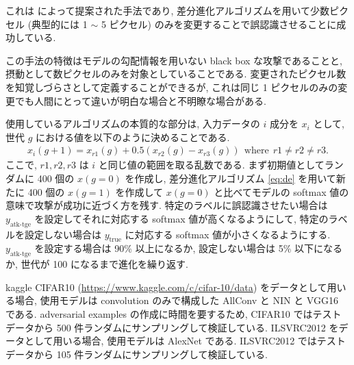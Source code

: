 これは \cite{su2019one} によって提案された手法であり, 差分進化アルゴリズムを用いて少数ピクセル (典型的には 1 $\sim$ 5 ピクセル) のみを変更することで誤認識させることに成功している.

この手法の特徴はモデルの勾配情報を用いない black box な攻撃であることと, 摂動として数ピクセルのみを対象としていることである.
変更されたピクセル数を知覚しづらさとして定義することができるが, これは同じ 1 ピクセルのみの変更でも人間にとって違いが明白な場合と不明瞭な場合がある.

使用しているアルゴリズムの本質的な部分は, 入力データの $i$ 成分を $x_i$ として, 世代 $g$ における値を以下のように決めることである.
%
\begin{eqnarray}
x_i (g + 1) = x_{r1} (g) + 0.5 (x_{r2} (g) - x_{r3} (g)) \ \ \text{where} \ \ r1 \neq r2 \neq r3.
\label{eq:de}
\end{eqnarray}
%
ここで, $r1, r2, r3$ は $i$ と同じ値の範囲を取る乱数である.
まず初期値としてランダムに 400 個の $x(g=0)$ を作成し, 差分進化アルゴリズム \ref{eq:de} を用いて新たに 400 個の $x(g=1)$ を作成して $x(g=0)$ と比べてモデルの softmax 値の意味で攻撃が成功に近づく方を残す.
特定のラベルに誤認識させたい場合は $y_{\text{atk-tge}}$ を設定してそれに対応する softmax 値が高くなるようにして, 特定のラベルを設定しない場合は $y_{\text{true}}$ に対応する softmax 値が小さくなるようにする.
$y_{\text{atk-tge}}$ を設定する場合は 90\% 以上になるか, 設定しない場合は 5\% 以下になるか, 世代が 100 になるまで進化を繰り返す.

kaggle CIFAR10 (\href{https://www.kaggle.com/c/cifar-10/data}{https://www.kaggle.com/c/cifar-10/data}) をデータとして用いる場合, 使用モデルは convolution のみで構成した AllConv と NIN \cite{lin2013network} と VGG16 である.
adversarial examples の作成に時間を要するため, CIFAR10 ではテストデータから 500 件ランダムにサンプリングして検証している.
ILSVRC2012 をデータとして用いる場合, 使用モデルは AlexNet である.
ILSVRC2012 ではテストデータから 105 件ランダムにサンプリングして検証している.


